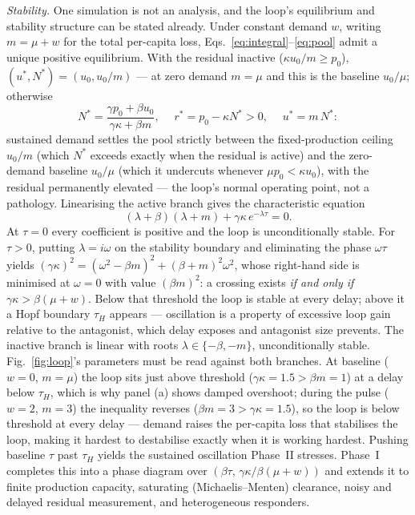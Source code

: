 \documentclass[twoside,twocolumn,usenatbib]{mnras}
\begin{document}
\emph{Stability.} One simulation is not an analysis, and the loop's
equilibrium and stability structure can be stated already. Under
constant demand $w$, writing $m = \mu + w$ for the total per-capita
loss, Eqs.~\ref{eq:integral}--\ref{eq:pool} admit a
unique positive equilibrium. With the residual inactive
($\kappa u_0/m \ge p_0$), $(u^*, N^*) = (u_0, u_0/m)$ --- at zero
demand $m = \mu$ and this is the baseline $u_0/\mu$; otherwise
\begin{equation}
N^* = \frac{\gamma p_0 + \beta u_0}{\gamma\kappa + \beta m},
\quad\; r^* = p_0 - \kappa N^* > 0, \quad\; u^* = m\, N^* :
\label{eq:eqm}
\end{equation}
sustained demand settles the pool strictly between the fixed-production
ceiling $u_0/m$ (which $N^*$ exceeds exactly when the residual is
active) and the zero-demand baseline $u_0/\mu$ (which it undercuts
whenever $\mu p_0 < \kappa u_0$), with the residual
permanently elevated --- the loop's normal operating point, not a
pathology. Linearising the active branch gives the
characteristic equation
\begin{equation}
(\lambda + \beta)(\lambda + m) + \gamma\kappa\, e^{-\lambda \tau} = 0 .
\label{eq:char}
\end{equation}
At $\tau = 0$ every coefficient is positive and the loop is
unconditionally stable. For $\tau > 0$, putting $\lambda = i\omega$ on
the stability boundary and eliminating the phase $\omega\tau$ yields
$(\gamma\kappa)^2 = (\omega^2 - \beta m)^2 + (\beta + m)^2 \omega^2$,
whose right-hand side is minimised at $\omega = 0$ with value
$(\beta m)^2$: a crossing exists \emph{if and only if}
$\gamma\kappa > \beta(\mu + w)$. Below that threshold the loop is
stable at every delay; above it a Hopf boundary $\tau_H$ appears ---
oscillation is a property of excessive loop gain relative to the
antagonist, which delay exposes and antagonist size prevents. The
inactive branch is linear with roots $\lambda \in \{-\beta, -m\}$,
unconditionally stable. Fig.~\ref{fig:loop}'s parameters must be read
against both branches. At baseline ($w = 0$, $m = \mu$) the loop sits
just above threshold ($\gamma\kappa = 1.5 > \beta m = 1$) at a delay
below $\tau_H$, which is why panel (a) shows damped overshoot; during
the pulse ($w = 2$, $m = 3$) the inequality reverses
($\beta m = 3 > \gamma\kappa = 1.5$), so the loop is below threshold at
every delay --- demand raises the per-capita loss that stabilises the
loop, making it hardest to destabilise exactly when it is working
hardest. Pushing baseline $\tau$
past $\tau_H$ yields the sustained oscillation Phase~II stresses.
Phase~I completes this into a phase diagram over $(\beta \tau,\,
\gamma\kappa/\beta(\mu+w))$ and extends it to finite production
capacity, saturating (Michaelis--Menten) clearance, noisy and delayed
residual measurement, and heterogeneous responders.
\end{document}
